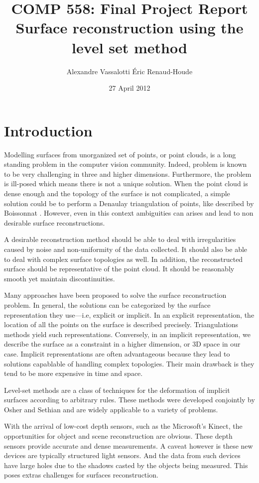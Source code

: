 \documentclass{article}
\author{Alexandre Vassalotti \quad \'{E}ric Renaud-Houde}
\title{COMP 558: Final Project Report \\
  \large \textbf{Surface reconstruction using the level set method}
}
\date{27 April 2012}
\begin{document}
\maketitle
\section{Introduction}
Modelling surfaces from unorganized set of points, or point clouds, is a long
standing problem in the computer vision community. Indeed, problem is known to
be very challenging in three and higher dimensions. Furthermore, the problem
is ill-posed which means there is not a unique solution. When the point cloud
is dense enough and the topology of the surface is not complicated, a simple
solution could be to perform a Denaulay triangulation of points, like
described by Boissonnat \cite{boissonnat1984geometric}. However, even in this
context ambiguities can arises and lead to non desirable surface
reconstructions.

A desirable reconstruction method should be able to deal with irregularities
caused by noise and non-uniformity of the data collected. It should also be
able to deal with complex surface topologies as well. In addition, the
reconstructed surface should be representative of the point cloud. It should
be reasonably smooth yet maintain discontinuities.

Many approaches have been proposed to solve the surface reconstruction
problem. In general, the solutions can be categorized by the surface
representation they use---i.e, explicit or implicit. In an explicit
representation, the location of all the points on the surface is described
precisely. Triangulations methods yield such representations. Conversely, in
an implicit representation, we describe the surface as a constraint in a
higher dimension, or 3D space in our case. Implicit representations are often
advantageous because they lead to solutions capablable of handling complex
topologies. Their main drawback is they tend to be more expensive in time and
space.

Level-set methods are a class of techniques for the deformation of implicit
surfaces according to arbitrary rules. These methods were developed conjointly
by Osher and Sethian \cite{sethian1999level} and are widely applicable to a
variety of problems.

With the arrival of low-cost depth sensors, such as the Microsoft's Kinect,
the opportunities for object and scene reconstruction are obvious. These depth
sensors provide accurate and dense measurements. A caveat however is these new
devices are typically structured light sensors. And the data from such devices
have large holes due to the shadows casted by the objects being measured. This
poses extras challenges for surfaces reconstruction.
\end{document}
